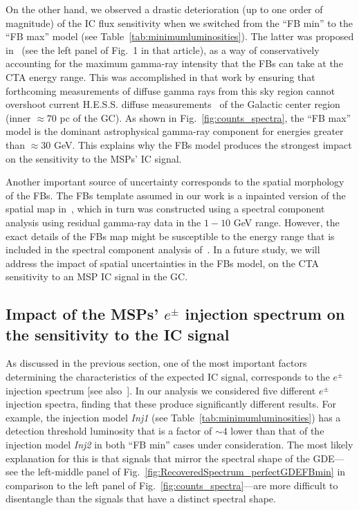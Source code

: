 \documentclass[doublespace,nopageskip]{VTthesis} %
\begin{document}
On the other hand, we observed a drastic deterioration (up to one order of magnitude) of the IC flux  sensitivity when we switched from the ``FB min'' to the ``FB max'' model (see Table~\ref{tab:minimumluminosities}). 
The latter was proposed in~\cite{Rinchiuso:2020skh} (see the left panel of Fig.~1 in that article), as a way of conservatively accounting for the maximum gamma-ray intensity that the FBs can take at the CTA energy range. This was accomplished in that work by ensuring that forthcoming measurements of diffuse gamma rays from this sky region cannot overshoot current H.E.S.S. diffuse measurements~\citep{Abramowski:2016mir} of the Galactic center region (inner $\approx 70$ pc of the GC). As shown in Fig.~\ref{fig:counts_spectra}, the ``FB max'' model is the dominant astrophysical gamma-ray component for energies greater than $\approx 30$ GeV. This explains why the FBs model produces the strongest impact on the sensitivity to the MSPs' IC signal.

Another important source of uncertainty corresponds to the spatial morphology of the FBs. The FBs template assumed in our work is a inpainted version of the spatial map in~\cite{TheFermi-LAT:2017vmf}, which in turn was constructed using a spectral component analysis using residual gamma-ray data in the $1-10$ GeV range. However, the exact details of the FBs map might be susceptible to the energy range that is included in the spectral component analysis of~\cite{TheFermi-LAT:2017vmf}. In a future study, we will address the impact of spatial uncertainties in the FBs model, on the CTA sensitivity to an MSP IC signal in the GC.  

\subsection{Impact of the MSPs' $e^\pm$ injection spectrum on the sensitivity to the IC signal}

As discussed in the previous section, one of the most important factors determining the characteristics of the expected IC signal, corresponds to the $e^\pm$ injection spectrum [see also~\citep{Song:2019nrx}]. In our analysis we  considered five different $e^\pm$ injection spectra, finding that these produce significantly different results. For example, the injection model \textit{Inj1} (see Table~\ref{tab:minimumluminosities}) has a detection threshold luminosity that is a factor of $\sim 4$
lower than that of the injection model \textit{Inj2} in both ``FB min'' cases under consideration. The most likely explanation for this is that signals that mirror the spectral shape of the GDE---see the left-middle panel of Fig.~\ref{fig:RecoveredSpectrum_perfectGDEFBmin} in comparison to the left panel of Fig.~\ref{fig:counts_spectra}---are more difficult
to disentangle than the signals that have a distinct spectral shape.
\end{document}
